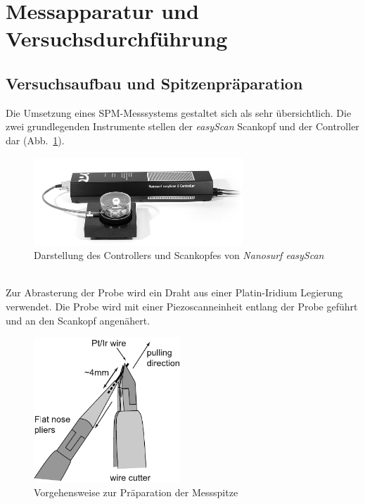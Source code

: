 \documentclass[a4paper,twoside,final]{article}
\begin{document}
\section{Messapparatur und Versuchsdurchführung} \label{sec:Versuchsdurchführung}
\subsection{Versuchsaufbau und Spitzenpräparation}
Die Umsetzung eines SPM-Messsystems gestaltet sich als sehr übersichtlich. Die zwei grundlegenden Instrumente stellen der \textit{easyScan} Scankopf und der Controller dar (Abb.~\ref{fig:Messsystem}).\\
\begin{figure}[htp]
  \vspace{-5mm}
    \centering
    \includegraphics[width=0.7\textwidth]{Bilder/EasyScanSystem.pdf}
    \caption{Darstellung des Controllers und Scankopfes von \textit{Nanosurf easyScan}}
    \label{fig:Messsystem}
\end{figure}\\
Zur Abrasterung der Probe wird ein Draht aus einer Platin-Iridium Legierung verwendet. Die Probe wird mit einer Piezoscanneinheit entlang der Probe geführt und an den Scankopf angenähert.
\begin{figure}
  \centering
  \vspace{-5mm}
  \includegraphics[width=5.5cm]{Bilder/WireCutter.pdf}
  \caption{Vorgehensweise zur Präparation der Messspitze}
  \label{fig:Spitzenpräparation}
\end{figure}
\end{document}
